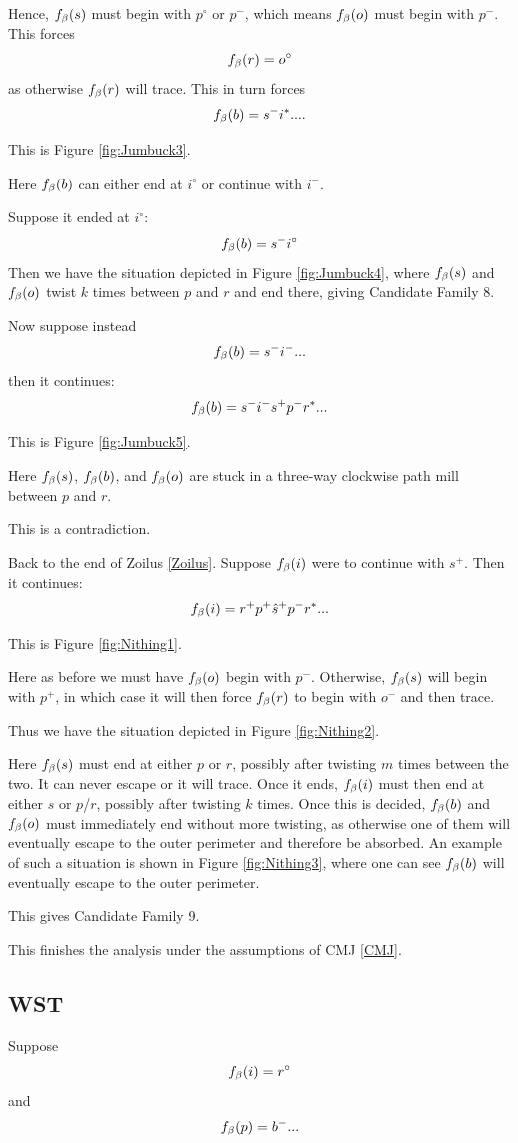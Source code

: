 Hence, $f_\beta(s)$ must begin with $p^\circ$ or $p^-$, which means $f_\beta(o)$ must begin with $p^-$. This forces 
$$f_\beta(r) = o^\circ$$
as otherwise $f_\beta(r)$ will trace. This in turn forces
$$f_\beta(b) = s^- i^*....$$

This is Figure \ref{fig:Jumbuck3}.

Here $f_\beta(b)$ can either end at $i^\circ$ or continue with $i^-$.

Suppose it ended at $i^\circ$:
$$f_\beta(b) = s^- i^\circ$$
Then we have the situation depicted in Figure \ref{fig:Jumbuck4}, where $f_\beta(s)$ and $f_\beta(o)$ twist $k$ times between $p$ and $r$ and end there, giving Candidate Family 8.

Now suppose instead
$$f_\beta(b) = s^- i^-...$$
then it continues:
$$f_\beta(b) = s^- i^- s^+ p^- r^*...$$

This is Figure \ref{fig:Jumbuck5}. 

Here $f_\beta(s)$, $f_\beta(b)$, and $f_\beta(o)$ are stuck in a three-way clockwise path mill between $p$ and $r$. 

This is a contradiction.

\label{Nithing}
Back to the end of Zoilus \ref{Zoilus}. Suppose $f_\beta(i)$ were to continue with $s^+$. Then it continues:
$$f_\beta(i) = r^+ p^+ \hat{s}^+ p^- r^*...$$

This is Figure \ref{fig:Nithing1}.

Here as before we must have $f_\beta(o)$ begin with $p^-$. Otherwise, $f_\beta(s)$ will begin with $p^+$, in which case it will then force $f_\beta(r)$ to begin with $o^-$ and then trace.

Thus we have the situation depicted in Figure \ref{fig:Nithing2}.

Here $f_\beta(s)$ must end at either $p$ or $r$, possibly after twisting $m$ times between the two. It can never escape or it will trace. Once it ends, $f_\beta(i)$ must then end at either $s$ or $p$/$r$, possibly after twisting $k$ times. Once this is decided, $f_\beta(b)$ and $f_\beta(o)$ must immediately end without more twisting, as otherwise one of them will eventually escape to the outer perimeter and therefore be absorbed. An example of such a situation is shown in Figure \ref{fig:Nithing3}, where one can see $f_\beta(b)$ will eventually escape to the outer perimeter. 

This gives Candidate Family 9.

This finishes the analysis under the assumptions of CMJ \ref{CMJ}.

\subsection{WST}\label{WST}
Suppose
$$f_\beta(i) = r^\circ$$
and
$$f_\beta(p) = b^-...$$

